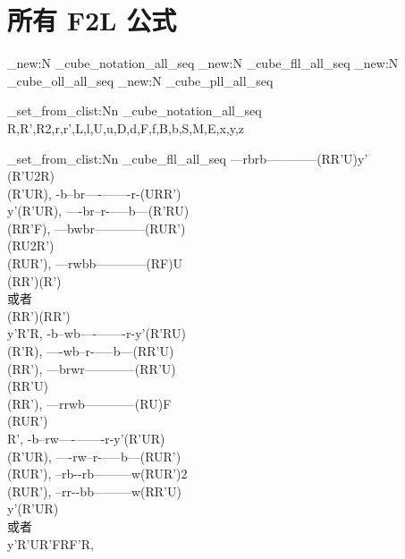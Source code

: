\documentclass{article}
\begin{document}
\section*{所有 F2L 公式}

\ExplSyntaxOn %
\seq_new:N \g_cube_notation_all_seq
\seq_new:N \g_cube_fll_all_seq
\seq_new:N \g_cube_oll_all_seq
\seq_new:N \g_cube_pll_all_seq

\seq_set_from_clist:Nn \g_cube_notation_all_seq {R,R',R2,r,r',L,l,U,u,D,d,F,f,B,b,S,M,E,x,y,z}

\seq_set_from_clist:Nn \g_cube_fll_all_seq {
    {---rb}{rb---}{---------}{(RR'U)y'\\(R'U2R)\\(R'UR)}, %
    {-b--b}{r----}{-------r-}{(URR')\\y'(R'UR)}, %
    {----b}{r--r-}{-----b---}{(R'RU)\\(RR'F)}, %
    {---bw}{br---}{---------}{(RUR')\\(RU2R')\\(RUR')}, %
    {---rw}{bb---}{---------}{(RF)U\\(RR')(R')\\或者\\(RR')(RR')\\y'R'R}, %
    {-b--w}{b----}{-------r-}{y'(R'RU)\\(R'R)}, %
    {----w}{b--r-}{-----b---}{(RR'U)\\(RR')}, %
    {---br}{wr---}{---------}{(RR'U)\\(RR'U)\\(RR')}, %
    {---rr}{wb---}{---------}{(RU)F\\(RUR')\\R'}, %
    {-b--r}{w----}{-------r-}{y'(R'UR)\\(R'UR)}, %
    {----r}{w--r-}{-----b---}{(RUR')\\(RUR')}, %
    {--rb-}{-rb--}{--------w}{(RUR')2\\(RUR')}, %
    {--rr-}{-bb--}{--------w}{(RR'U)\\y'(R'UR)\\或者\\y'R'UR'FRF'R}, %
}
\end{document}
